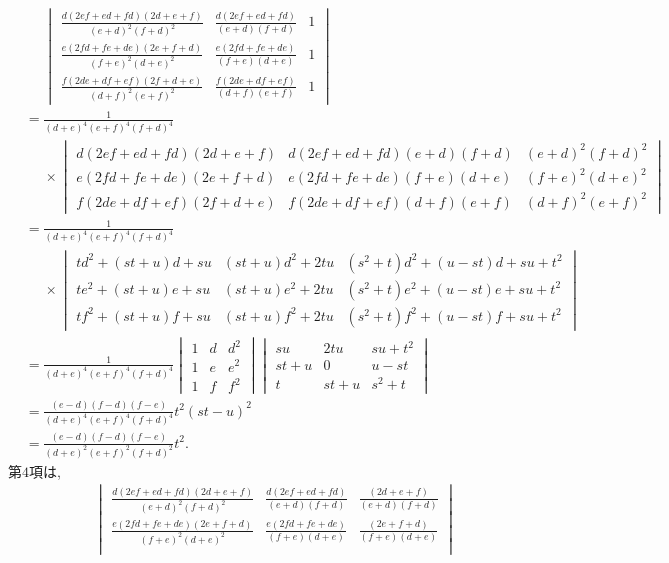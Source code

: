 \begin{prf*}
\begin{align*}
&\phantom{{}={}}\begin{vmatrix}
\frac{d(2ef+ed+fd)(2d+e+f)}{(e+d)^2(f+d)^2}&\frac{d(2ef+ed+fd)}{(e+d)(f+d)}&1\\
\frac{e(2fd+fe+de)(2e+f+d)}{(f+e)^2(d+e)^2}&\frac{e(2fd+fe+de)}{(f+e)(d+e)}&1\\
\frac{f(2de+df+ef)(2f+d+e)}{(d+f)^2(e+f)^2}&\frac{f(2de+df+ef)}{(d+f)(e+f)}&1
\end{vmatrix}\\
&=\frac{1}{(d+e)^4(e+f)^4(f+d)^4}\\
&\phantom{{}={}}\times\begin{vmatrix}
d(2ef+ed+fd)(2d+e+f)&d(2ef+ed+fd)(e+d)(f+d)&(e+d)^2(f+d)^2\\
e(2fd+fe+de)(2e+f+d)&e(2fd+fe+de)(f+e)(d+e)&(f+e)^2(d+e)^2\\
f(2de+df+ef)(2f+d+e)&f(2de+df+ef)(d+f)(e+f)&(d+f)^2(e+f)^2
\end{vmatrix}\\
&=\frac{1}{(d+e)^4(e+f)^4(f+d)^4}\\
&\phantom{{}={}}\times\begin{vmatrix}
td^2+(st+u)d+su&(st+u)d^2+2tu&(s^2+t)d^2+(u-st)d+su+t^2\\
te^2+(st+u)e+su&(st+u)e^2+2tu&(s^2+t)e^2+(u-st)e+su+t^2\\
tf^2+(st+u)f+su&(st+u)f^2+2tu&(s^2+t)f^2+(u-st)f+su+t^2
\end{vmatrix}\\
&=\frac{1}{(d+e)^4(e+f)^4(f+d)^4}
\begin{vmatrix}
1&d&d^2\\
1&e&e^2\\
1&f&f^2
\end{vmatrix}
\begin{vmatrix}
su&2tu&su+t^2\\
st+u&0&u-st\\
t&st+u&s^2+t
\end{vmatrix}\\
&=\frac{(e-d)(f-d)(f-e)}{(d+e)^4(e+f)^4(f+d)^4}t^2(st-u)^2\\
&=\frac{(e-d)(f-d)(f-e)}{(d+e)^2(e+f)^2(f+d)^2}t^2.
\end{align*}
%
第$4$項は,
\begin{align*}
&\phantom{{}={}}\begin{vmatrix}
\frac{d(2ef+ed+fd)(2d+e+f)}{(e+d)^2(f+d)^2}&\frac{d(2ef+ed+fd)}{(e+d)(f+d)}&\frac{(2d+e+f)}{(e+d)(f+d)}\\
\frac{e(2fd+fe+de)(2e+f+d)}{(f+e)^2(d+e)^2}&\frac{e(2fd+fe+de)}{(f+e)(d+e)}&\frac{(2e+f+d)}{(f+e)(d+e)}\\

\end{vmatrix}
\end{align*}
\end{prf*}
